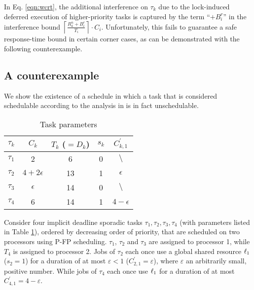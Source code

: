 In Eq. \ref{eqn:wcrt}, the additional interference on $\tau_k$ due to the lock-induced deferred execution of higher-priority tasks is captured by the term ``$+ B^r_i$'' in the interference bound  $\left \lceil \frac{R_k^n + B_i^r}{T_i} \right \rceil \cdot C_i$. Unfortunately, this fails to guarantee a safe response-time bound in certain corner cases, as can be demonstrated with the following counterexample.

\subsection{A counterexample}
\label{sec:counterexample}

We show the existence of a schedule in which a task that is considered schedulable according to the analysis in \cite{lakshmanan-2009} is in fact unschedulable.

%

\begin{table}
\centering
    \begin{tabular}{|c|c|c|c|c|} 
 \hline
        $\tau_k$ & $C_k$ & $T_k$ ($= D_k$) & $s_k$ & $C_{k,1}^{\prime}$\\
        \hline
        $\tau_1$ & 2             & 6  & 0 & $\setminus$\\ 
        $\tau_2$ & $4+2\epsilon$ & 13 & 1 & $\epsilon$\\
        $\tau_3$ & $\epsilon$    & 14 & 0 & $\setminus$\\
        $\tau_4$ & 6             & 14 & 1 & $4-\epsilon$\\ 
        \hline
    \end{tabular}
    \caption{Task parameters}
    \label{table:parameters}
\end{table}

Consider four implicit deadline sporadic tasks ${\tau_1, \tau_2, \tau_3, \tau_4}$ (with parameters listed in Table \ref{table:parameters}), ordered by decreasing order of priority, that are scheduled on two processors using P-FP scheduling. $\tau_1$, $\tau_2$ and $\tau_3$ are assigned to processor 1, while $T_4$ is assigned to processor 2. Jobs of $\tau_2$ each once use a global shared resource $\ell_1$  ($s_2 = 1$) for a duration of at most $\varepsilon < 1$ ($C_{2,1}^{\prime} = \varepsilon$), where $\varepsilon$ an arbitrarily small, positive number. While jobs of $\tau_4$ each once use $\ell_1$ for a duration of at most $C_{4,1}^{\prime} = 4-\varepsilon$. 

